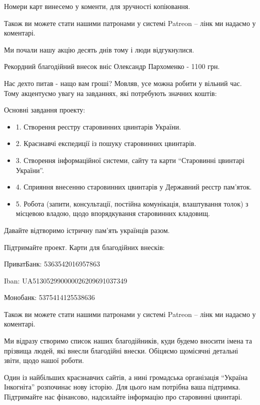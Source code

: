 Номери карт винесемо у коменти, для зручності копіювання.

Також ви можете стати нашими патронами у системі Patreon – лінк ми надаємо у
коментарі.


Ми почали нашу акцію десять днів тому і люди відгукнулися. 

Рекордний благодійний внесок вніс Олександр Пархоменко - 1100 грн. 


Нас дехто питав - нащо вам гроші? Мовляв, усе можна робити у вільний час. Тому
акцентуємо увагу на завданнях, які потребують значних коштів:

Основні завдання проекту:

\begin{itemize}
  \item 1. Створення реєстру старовинних цвинтарів України.
  \item 2. Краєзнавчі експедиції із пошуку старовинних цвинтарів.
  \item 3. Створення інформаційної системи, сайту та карти \enquote{Старовинні цвинтарі України}.
  \item 4. Сприяння внесенню старовинних цвинтарів у Державний реєстр пам’яток.
  \item 5. Робота (запити, консультації, постійна комунікація, влаштування
          толок) з місцевою владою, щодо впорядкування старовинних кладовищ.
\end{itemize}

Давайте відтворимо істричну пам’ять українців разом. 

Підтримайте проект.  Карти для благодійних внесків:

ПриватБанк: 5363542016957863

Iban: UA513052990000026209691037349

Монобанк: 5375414125538636


Також ви можете стати нашими патронами у системі Patreon – лінк ми надаємо у коментарі.

Ми відразу створимо список наших благодійників, куди будемо вносити імена та
прізвища людей, які внесли благодійні внески. Обіцяємо щомісячні детальні
звіти, щодо нашої роботи.

Один із найбільших краєзнавчих сайтів, а нині громадська організація \enquote{Україна
Інкогніта} розпочинає нову історію. Для цього нам потрібна ваша підтримка.
Підтримайте нас фінансово, надсилайте інформацію про старовинні цвинтарі. 

